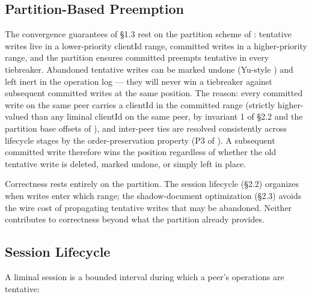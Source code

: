 \subsection{Partition-Based Preemption}

The convergence guarantees of \S1.3 rest on the partition scheme of \cite{plexus:partitioning}: tentative writes live in a lower-priority clientId range, committed writes in a higher-priority range, and the partition ensures committed preempts tentative in every tiebreaker. Abandoned tentative writes can be marked undone (Yu-style \cite{yu2019opodis}) and left inert in the operation log --- they will never win a tiebreaker against subsequent committed writes at the same position. The reason: every committed write on the same peer carries a clientId in the committed range (strictly higher-valued than any liminal clientId on the same peer, by invariant 1 of \S2.2 and the partition base offsets of \cite{plexus:partitioning}), and inter-peer ties are resolved consistently across lifecycle stages by the order-preservation property (P3 of \cite{plexus:partitioning}). A subsequent committed write therefore wins the position regardless of whether the old tentative write is deleted, marked undone, or simply left in place.

Correctness rests entirely on the partition. The session lifecycle (\S2.2) organizes when writes enter which range; the shadow-document optimization (\S2.3) avoids the wire cost of propagating tentative writes that may be abandoned. Neither contributes to correctness beyond what the partition already provides.

\subsection{Session Lifecycle}

A liminal session is a bounded interval during which a peer's operations are tentative:

